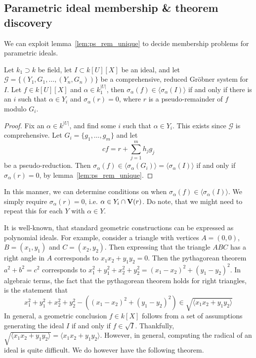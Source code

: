 \subsection{Parametric ideal membership \& theorem discovery}\label{sec:ps_div_app}
We can exploit lemma~\ref{lem:ps_rem_unique} to decide membership problems for parametric ideals.

\begin{theorem}
  Let $k_{1} \supset k$ be field, let $I \subset k[U][X]$ be an ideal, and let $\mathcal G = \{(Y_{1}, G_{1}, \dots, (Y_{n}, G_{n}))\}$ be a comprehensive, reduced Gröbner system for $I$. Let $f \in k[U][X]$ and $\alpha \in k_{1}^{|U|}$, then $\sigma_{\alpha}(f) \in \langle \sigma_{\alpha}(I) \rangle$ if and only if there is an $i$ such that $\alpha \in Y_{i}$ and $\sigma_{\alpha}(r) = 0$, where $r$ is a pseudo-remainder of $f$ modulo $G_{i}$.
\end{theorem}
\begin{proof}
  Fix an $\alpha \in k^{|U|}$, and find some $i$ such that $\alpha \in Y_{i}$. This exists since $\mathcal G$ is comprehensive. Let $G_{i} = \{g_{1}, \dots, g_{m}\}$ and let
  \[c f = r + \sum_{j=1}^{m} h_{j} g_{j}\]
  be a pseudo-reduction. Then $\sigma_{\alpha}(f) \in \langle \sigma_{\alpha}(G_{i}) \rangle = \langle \sigma_{\alpha}(I) \rangle$ if and only if $\sigma_{\alpha}(r) = 0$, by lemma~\ref{lem:ps_rem_unique}.
\end{proof}

In this manner, we can determine conditions on when $\sigma_{\alpha}(f) \in \langle \sigma_{\alpha}(I) \rangle$. We simply require $\sigma_{\alpha}(r) = 0$, i.e. $\alpha \in Y_{i} \cap \operatorname{\mathbf V}(r)$. Do note, that we might need to repeat this for each $Y$ with $\alpha \in Y$.

It is well-known, that standard geometric constructions can be expressed as polynomial ideals. For example, consider a triangle with vertices $A = (0, 0)$, $B = (x_{1}, y_{1})$ and $C = (x_{2}, y_{2})$. Then expressing that the triangle $ABC$ has a right angle in $A$ corresponds to $x_{1} x_{2} + y_{1} y_{2} = 0$. Then the pythagorean theorem $a^{2} + b^{2} = c^{2}$ corresponds to $x_{1}^{2} + y_{1}^{2} + x_{2}^{2} + y_{2}^{2} = (x_{1} - x_{2})^{2} + (y_{1} - y_{2})^{2}$. In algebraic terms, the fact that the pythagorean theorem holds for right triangles, is the statement that
\[x_{1}^{2} + y_{1}^{2} + x_{2}^{2} + y_{2}^{2} - \left((x_{1} - x_{2})^{2} + (y_{1} - y_{2})^{2}\right) \in \sqrt{\langle x_{1} x_{2} + y_{1} y_{2} \rangle} \]
In general, a geometric conclusion $f \in k[X]$ follows from a set of assumptions generating the ideal $I$ if and only if $f \in \sqrt{I}$. Thankfully, $\sqrt{ \langle x_{1} x_{2} + y_{1} y_{2} \rangle } = \langle x_{1} x_{2} + y_{1} y_{2} \rangle$. However, in general, computing the radical of an ideal is quite difficult. We do however have the following theorem.

